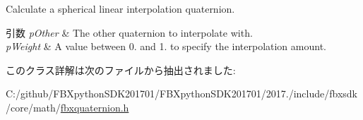 Calculate a spherical linear interpolation quaternion. 
\begin{DoxyParams}{引数}
{\em p\+Other} & The other quaternion to interpolate with. \\
\hline
{\em p\+Weight} & A value between 0. and 1. to specify the interpolation amount. \\
\hline
\end{DoxyParams}


このクラス詳解は次のファイルから抽出されました\+:\begin{DoxyCompactItemize}
\item 
C\+:/github/\+F\+B\+Xpython\+S\+D\+K201701/\+F\+B\+Xpython\+S\+D\+K201701/2017./include/fbxsdk/core/math/\hyperlink{fbxquaternion_8h}{fbxquaternion.\+h}\end{DoxyCompactItemize}
